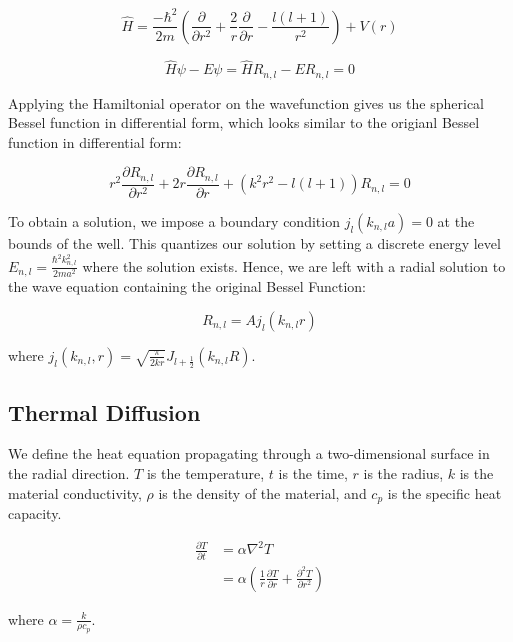 \documentclass[linenumbers, RNAAS, trackchanges]{aastex631}
\begin{document}
\begin{equation}
    \hat{H}=\frac{-\hbar ^2}{2m}\left(\frac{\partial}{\partial r^2} + \frac{2}{r} \frac{\partial}{\partial r} - \frac{l(l+1)}{r^2}\right) +V(r)
\end{equation}

\begin{equation}
    \hat{H}\psi-E\psi=\hat{H}R_{n,l}-ER_{n,l}=0
\end{equation}

\noindent Applying the Hamiltonial operator on the wavefunction gives us the
spherical Bessel function in differential form, which looks similar to the
origianl Bessel function in differential form:

\begin{equation}
    r^2\frac{\partial R_{n,l}}{\partial r^2} + 2r\frac{\partial R_{n,l}}{\partial r} +(k^2r^2-l(l+1))R_{n,l}=0
\end{equation}

\noindent To obtain a solution, we impose a boundary condition $j_l(k_{n,l}a)=0$ at the
bounds of the well. This quantizes our solution by setting a discrete energy
level $E_{n,l}=\frac{\hbar^2k_{n,l}^2}{2ma^2}$ where the solution exists. Hence,
we are left with a radial solution to the wave equation containing the original
Bessel Function:

\begin{equation}
    R_{n,l}=Aj_l(k_{n,l}r)
\end{equation}

\noindent where $j_l(k_{n,l},r)=\sqrt{\frac{\pi}{2kr}}J_{l+\frac{1}{2}}(k_{n,l}R)$.


\subsection{Thermal Diffusion}

We define the heat equation propagating through a two-dimensional surface in
the radial direction. $T$ is the temperature, $t$ is the time, $r$ is the radius,
$k$ is the material conductivity, $\rho$ is the density of the material, and $c_p$
is the specific heat capacity.

\begin{align}
    \frac{\partial T}{\partial t}&=\alpha\nabla^2T\\
    &=\alpha\left(\frac{1}{r} \frac{\partial T}{\partial r} + \frac{\partial^2 T}{\partial r^2}\right)
\end{align}

\noindent where $\alpha=\frac{k}{\rho c_p}$.
\end{document}
